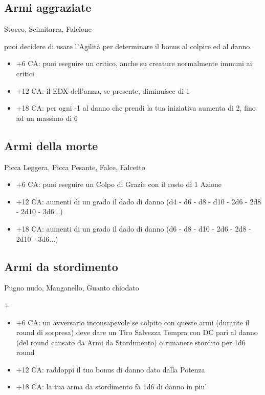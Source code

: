 \documentclass[a4paper,11pt,twoside,openany]{book}
\begin{document}
\subsection{Armi aggraziate} Stocco, Scimitarra, Falcione

puoi decidere di usare l'Agilità per determinare il bonus al colpire ed al danno.

\begin{itemize}
	\item +6 CA: puoi eseguire un critico, anche su creature normalmente immuni
	      ai critici

	\item +12 CA: il EDX dell'arma, se presente, diminuisce di 1

	\item +18 CA: per ogni -1 al danno che prendi la tua iniziativa aumenta di 2, fino ad un massimo di 6
\end{itemize}

\subsection{Armi della morte} Picca Leggera, Picca Pesante, Falce, Falcetto

\begin{itemize}
	\item +6 CA: puoi eseguire un Colpo di Grazie con il costo di 1 Azione

	\item +12 CA: aumenti di un grado il dado di danno (d4 - d6 - d8 - d10 - 2d6 - 2d8 - 2d10 - 3d6...)

	\item +18 CA: aumenti di un grado il dado di danno (d6 - d8 - d10 - 2d6 - 2d8 - 2d10 - 3d6...)

\end{itemize}

\subsection{Armi da stordimento} Pugno nudo, Manganello, Guanto chiodato

+\begin{itemize}
	\item +6 CA: un avversario inconsapevole se colpito con queste armi (durante il round di sorpresa) deve dare un Tiro Salvezza Tempra con DC pari al danno (del round causato da Armi da Stordimento) o rimanere stordito per 1d6 round

	\item +12 CA: raddoppi il tuo bonus di danno dato dalla Potenza

	\item +18 CA: la tua arma da stordimento fa 1d6 di danno in piu'
\end{itemize}
\end{document}
